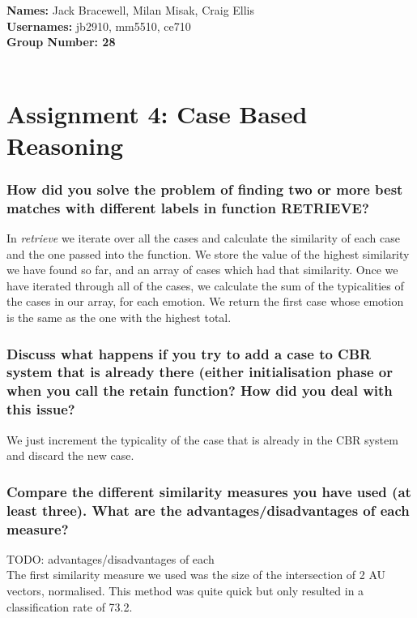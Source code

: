 \documentclass[12pt]{article}
\begin{document}
{\bf Names:} Jack Bracewell, Milan Misak, Craig Ellis \\
{\bf Usernames:} jb2910, mm5510, ce710 \\
{\bf Group Number: 28}  \\ \\

\section*{Assignment 4: Case Based Reasoning}

\subsubsection*{How did you solve the problem of finding two or more best matches with different labels in function RETRIEVE?}

In \emph{retrieve} we iterate over all the cases and calculate the similarity of each case and the one passed into the function. We store the value of the highest similarity we have found so far, and an array of cases which had that similarity. Once we have iterated through all of the cases, we calculate the sum of the typicalities of the cases in our array, for each emotion. We return the first case whose emotion is the same as the one with the highest total. \\

\subsubsection*{Discuss what happens if you try to add a case to CBR system that is already there (either initialisation phase or when you call the retain function? How did you deal with this issue?}

We just increment the typicality of the case that is already in the CBR system and discard the new case. 

\subsubsection*{Compare the different similarity measures you have used (at least three). What are the advantages/disadvantages of each measure?}
TODO: advantages/disadvantages of each \\

The first similarity measure we used was the size of the intersection of 2 AU vectors, normalised. This method was quite quick but only resulted in a classification rate of 73.2. \\ 
\end{document}
